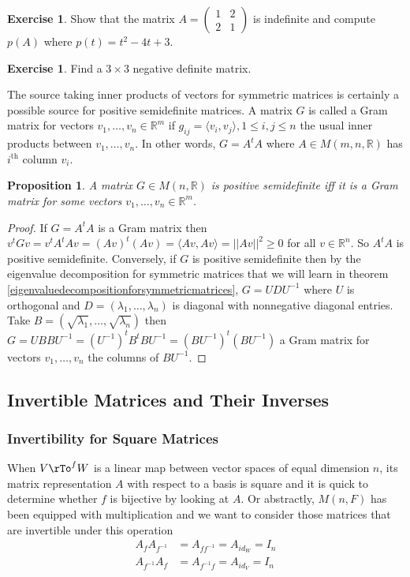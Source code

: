 \documentclass[12pt]{amsart}
\newtheorem{proposition}[theorem]{Proposition}
\theoremstyle{definition}
\newtheorem{exercise}[theorem]{Exercise}
\begin{document}
\begin{exercise}\label{} Show that the matrix $A = \left(\begin{array}{cc} 1 & 2 \\ 2 & 1 \end{array}\right)$ is indefinite and compute $p(A)$ where $p(t) = t^2 - 4t + 3$.
\end{exercise}

\begin{exercise}\label{} Find a $3 \times 3$ negative definite matrix.
\end{exercise}

The source taking inner products of vectors for symmetric matrices is certainly a possible source for positive semidefinite matrices. A matrix $G$ is called a Gram matrix for vectors $v_1, \dots, v_n \in \mathbb{R}^m$ if $g_{ij} = \langle v_i, v_j \rangle, 1 \leq i, j \leq n$ the usual inner products between $v_1, \dots, v_n$. In other words, $G = A^tA$ where $A \in M(m, n, \mathbb{R})$ has $i^{\text{th}}$ column $v_i$.

\begin{proposition}\label{Grammatrixpositivesemidefinite} A matrix $G \in M(n, \mathbb{R})$ is positive semidefinite iff it is a Gram matrix for some vectors $v_1, \dots, v_n \in \mathbb{R}^m$.
\end{proposition}
\begin{proof} If $G = A^tA$ is a Gram matrix then $v^tGv = v^tA^tAv = (Av)^t(Av) = \langle Av, Av \rangle = ||Av||^2 \geq 0$ for all $v \in \mathbb{R}^n$. So $A^tA$ is positive semidefinite. Conversely, if $G$ is positive semidefinite then by the eigenvalue decomposition for symmetric matrices that we will learn in theorem \ref{eigenvaluedecompositionforsymmetricmatrices}, $G = UDU^{-1}$ where $U$ is orthogonal and $D = (\lambda_1, \dots , \lambda_n)$ is diagonal with nonnegative diagonal entries. Take $B = (\sqrt{\lambda_1}, \dots , \sqrt{\lambda_n})$ then $G = UBBU^{-1} = (U^{-1})^tB^tBU^{-1} = (BU^{-1})^t(BU^{-1})$ a Gram matrix for vectors $v_1, \dots, v_n$ the columns of $BU^{-1}$.
\end{proof}

\subsection{Invertible Matrices and Their Inverses}

\subsubsection{Invertibility for Square Matrices} When $V \rTo^f W$ is a linear map between vector spaces of equal dimension $n$, its matrix representation $A$ with respect to a basis is square and it is quick to determine whether $f$ is bijective by looking at $A$. Or abstractly, $M(n, F)$ has been equipped with multiplication and we want to consider those matrices that are invertible under this operation
\begin{align*}
A_fA_{f^{-1}} & = A_{ff^{-1}} = A_{id_W} = I_n \\
A_{f^{-1}}A_f & = A_{f^{-1}f} = A_{id_V} = I_n
\end{align*}
\end{document}
